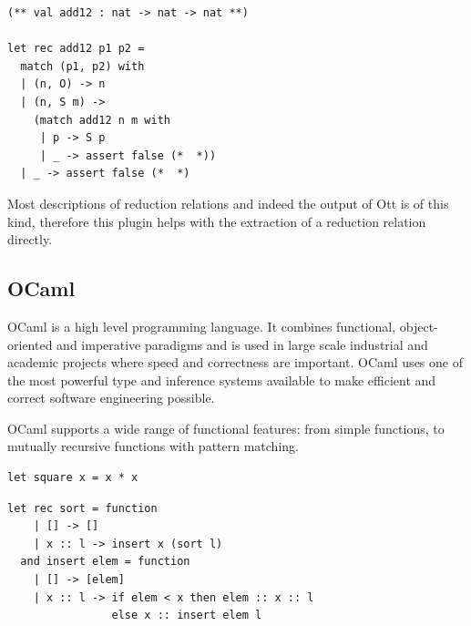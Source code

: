 \documentclass[12pt,twoside,notitlepage]{report}
\theoremstyle{plain}%
\theoremstyle{definition}
\theoremstyle{remark}
\begin{document}
\begin{minipage}{\linewidth}

\begin{lstlisting}[language={Coq},caption={Coq to OCaml extraction of a logical inductive relation}, label={lst:coqlogindextractex}]
(** val add12 : nat -> nat -> nat **)

let rec add12 p1 p2 =
  match (p1, p2) with
  | (n, O) -> n
  | (n, S m) ->
    (match add12 n m with
     | p -> S p
     | _ -> assert false (*  *))
  | _ -> assert false (*  *)
\end{lstlisting}

\end{minipage}

Most descriptions of reduction relations and indeed the output of Ott is of this kind, therefore this plugin helps with the extraction of a reduction relation directly. 

\subsection{OCaml}
OCaml is a high level programming language. It combines functional, object-oriented and imperative paradigms and is used in large scale industrial and academic projects where speed and correctness are  important. OCaml uses one of the most powerful type and inference systems available to make efficient and correct software engineering possible.

OCaml supports a wide range of functional features: from simple functions, to mutually recursive functions with pattern matching.
\vspace{3mm}

\begin{minipage}{\linewidth}
\begin{lstlisting}[caption={OCaml simple function example: square}]
let square x = x * x
\end{lstlisting}

\end{minipage}

\begin{minipage}{\linewidth}

\begin{lstlisting}[caption={OCaml complex function example: insertion sort}]
let rec sort = function
    | [] -> []
    | x :: l -> insert x (sort l)
  and insert elem = function
    | [] -> [elem]
    | x :: l -> if elem < x then elem :: x :: l
                else x :: insert elem l
\end{lstlisting}

\end{minipage}
\end{document}
